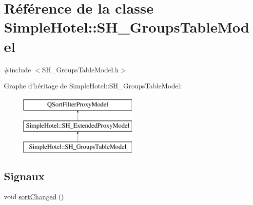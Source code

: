\hypertarget{classSimpleHotel_1_1SH__GroupsTableModel}{\section{Référence de la classe Simple\-Hotel\-:\-:S\-H\-\_\-\-Groups\-Table\-Model}
\label{classSimpleHotel_1_1SH__GroupsTableModel}
}


{\ttfamily \#include $<$S\-H\-\_\-\-Groups\-Table\-Model.\-h$>$}

Graphe d'héritage de Simple\-Hotel\-:\-:S\-H\-\_\-\-Groups\-Table\-Model\-:\begin{figure}[H]
\begin{center}
\leavevmode
\includegraphics[height=3.000000cm]{classSimpleHotel_1_1SH__GroupsTableModel}
\end{center}
\end{figure}
\subsection*{Signaux}
\begin{DoxyCompactItemize}
\item 
void \hyperlink{classSimpleHotel_1_1SH__ExtendedProxyModel_adb9ae03a88cda8d9efbed47527b5186a}{sort\-Changed} ()
\end{DoxyCompactItemize}
